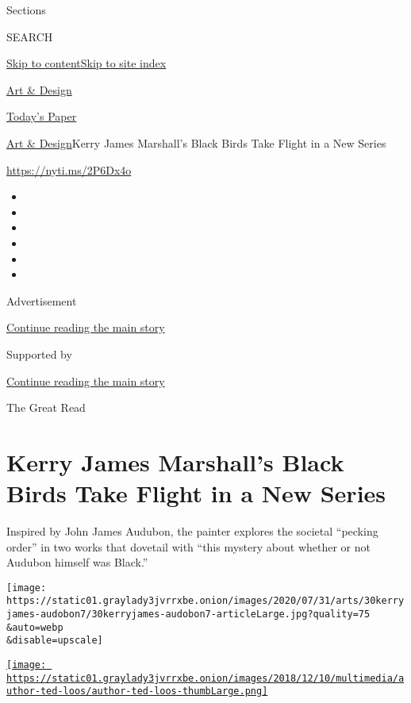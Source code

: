 Sections

SEARCH

\protect\hyperlink{site-content}{Skip to
content}\protect\hyperlink{site-index}{Skip to site index}

\href{https://www.nytimes3xbfgragh.onion/section/arts/design}{Art \&
Design}

\href{https://myaccount.nytimes3xbfgragh.onion/auth/login?response_type=cookie\&client_id=vi}{}

\href{https://www.nytimes3xbfgragh.onion/section/todayspaper}{Today's
Paper}

\href{/section/arts/design}{Art \& Design}\textbar{}Kerry James
Marshall's Black Birds Take Flight in a New Series

\url{https://nyti.ms/2P6Dx4o}

\begin{itemize}
\item
\item
\item
\item
\item
\item
\end{itemize}

Advertisement

\protect\hyperlink{after-top}{Continue reading the main story}

Supported by

\protect\hyperlink{after-sponsor}{Continue reading the main story}

The Great Read

\hypertarget{kerry-james-marshalls-black-birds-take-flight-in-a-new-series}{%
\section{Kerry James Marshall's Black Birds Take Flight in a New
Series}\label{kerry-james-marshalls-black-birds-take-flight-in-a-new-series}}

Inspired by John James Audubon, the painter explores the societal
``pecking order'' in two works that dovetail with ``this mystery about
whether or not Audubon himself was Black.''

\texttt{[image: https://static01.graylady3jvrrxbe.onion/images/2020/07/31/arts/30kerryjames-audobon7/30kerryjames-audobon7-articleLarge.jpg?quality=75\\\&auto=webp\\\&disable=upscale]}

\href{https://www.nytimes3xbfgragh.onion/by/ted-loos}{\texttt{[image: https://static01.graylady3jvrrxbe.onion/images/2018/12/10/multimedia/author-ted-loos/author-ted-loos-thumbLarge.png]}}

